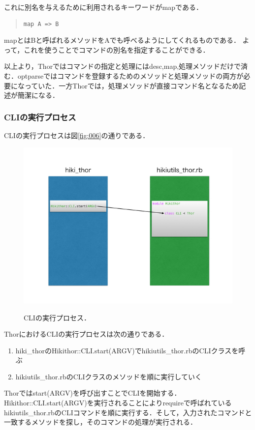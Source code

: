 これに別名を与えるために利用されるキーワードがmapである．
\begin{quote}\begin{verbatim}
map A => B
\end{verbatim}\end{quote}
mapとはBと呼ばれるメソッドをAでも呼べるようにしてくれるものである．
よって，これを使うことでコマンドの別名を指定することができる．

以上より，Thorではコマンドの指定と処理にはdesc,map,処理メソッドだけで済む．optparseではコマンドを登録するためのメソッドと処理メソッドの両方が必要になっていた．一方Thorでは，処理メソッドが直接コマンド名となるため記述が簡潔になる．

\subsubsection{CLIの実行プロセス}
CLIの実行プロセスは図\ref{fig:006}の通りである．

\begin{figure}[htbp]\begin{center}
\includegraphics[width=12cm,bb= 0 0 737 553]{../figs/./hikiutils_yamane.006.jpg}
\caption{CLIの実行プロセス．}
\label{fig:006}
\label{default}\end{center}\end{figure}
ThorにおけるCLIの実行プロセスは次の通りである．

\begin{enumerate}
\item hiki\_thorのHikithor::CLI.start(ARGV)でhikiutils\_thor.rbのCLIクラスを呼ぶ
\item hikiutils\_thor.rbのCLIクラスのメソッドを順に実行していく
\end{enumerate}
Thorではstart(ARGV)を呼び出すことでCLIを開始する．Hikithor::CLI.start(ARGV)を実行されることによりrequireで呼ばれているhikiutils\_thor.rbのCLIコマンドを順に実行する．そして，入力されたコマンドと一致するメソッドを探し，そのコマンドの処理が実行される．

